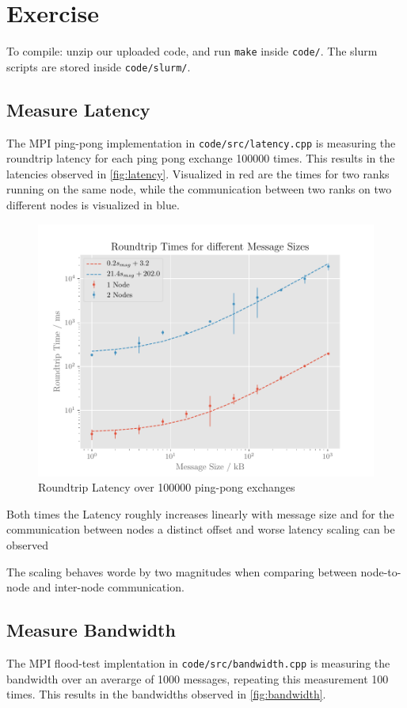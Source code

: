 \documentclass[]{scrartcl}
\newcommand{\exercise}{Exercise \thesection}
\begin{document}
\section*{\exercise}

To compile: unzip our uploaded code, and run \verb|make| inside \verb|code/|.
The slurm scripts are stored inside \verb|code/slurm/|.

\subsection{Measure Latency}
The MPI ping-pong implementation in \verb|code/src/latency.cpp| is measuring the roundtrip latency for each ping pong exchange 100000 times.
This results in the latencies observed in \autoref{fig:latency}.
Visualized in red are the times for two ranks running on the same node, while the communication between two ranks on two different nodes is visualized in blue.

\begin{figure}[ht]
    \centering
    \includegraphics[width=\linewidth]{img/latency}
    \caption{Roundtrip Latency over 100000 ping-pong exchanges}%
    \label{fig:latency}
\end{figure}

Both times the Latency roughly increases linearly with message size and for the communication between nodes a distinct offset and worse latency scaling can be observed

The scaling behaves worde by two magnitudes when comparing between node-to-node and inter-node communication.

\subsection{Measure Bandwidth}
The MPI flood-test implentation in \verb|code/src/bandwidth.cpp| is measuring the bandwidth over an averarge of 1000 messages, repeating this measurement 100 times.
This results in the bandwidths observed in \autoref{fig:bandwidth}.
\end{document}
